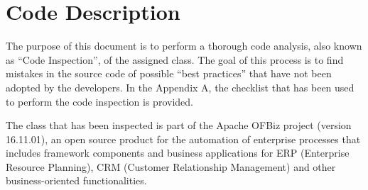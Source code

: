 \chapter{Code Description}
The purpose of this document is to perform a thorough code analysis, also known as \enquote{Code Inspection}, of the assigned class. The goal of this process is to find mistakes in the source code of possible \enquote{best practices} that have not been adopted by the developers. In the Appendix A, the checklist that has been used to perform the code inspection is provided.

The class that has been inspected is part of the Apache OFBiz project (version 16.11.01), an open source product for the automation of enterprise processes that includes framework components and business applications for ERP (Enterprise Resource Planning), CRM (Customer Relationship Management) and other business-oriented functionalities.




